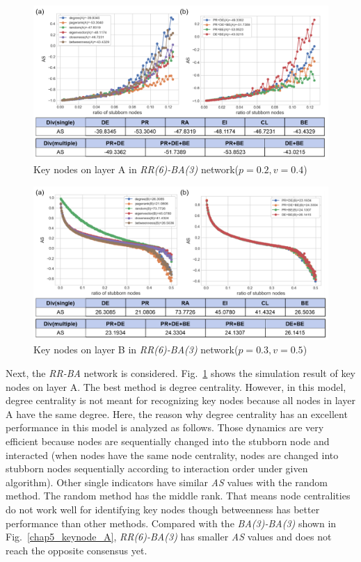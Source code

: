 \begin{figure}[!htb]
	\centering
	\includegraphics[width=\hsize]{figure/chap5_keynode_RR_BA_A.png}
	\caption{Key nodes on layer A in \textit{RR(6)-BA(3)} network($p=0.2, v=0.4$)}
	\label{chap5_keynode_RR_BA_A}
\end{figure}
\begin{figure}[!htb]
	\centering
	\includegraphics[width=\hsize]{figure/chap5_keynode_RR_BA_B.png}
	\caption{Key nodes on layer B in \textit{RR(6)-BA(3)} network($p=0.3, v=0.5$)}
	\label{chap5_keynode_RR_BA_B}
\end{figure}

Next, the \textit{RR-BA} network is considered. Fig.~\ref{chap5_keynode_RR_BA_A} shows the simulation result of key nodes on layer A. The best method is degree centrality. However, in this model, degree centrality is not meant for recognizing key nodes because all nodes in layer A have the same degree. Here, the reason why degree centrality has an excellent performance in this model is analyzed as follows. Those dynamics are very efficient because nodes are sequentially changed into the stubborn node and interacted (when nodes have the same node centrality, nodes are changed into stubborn nodes sequentially according to interaction order under given algorithm). Other single indicators have similar \textit{AS} values with the random method. The random method has the middle rank. That means node centralities do not work well for identifying key nodes though betweenness has better performance than other methods. Compared with the \textit{BA(3)-BA(3)} shown in Fig.~\ref{chap5_keynode_A}, \textit{RR(6)-BA(3)} has smaller \textit{AS} values and does not reach the opposite consensus yet. 

